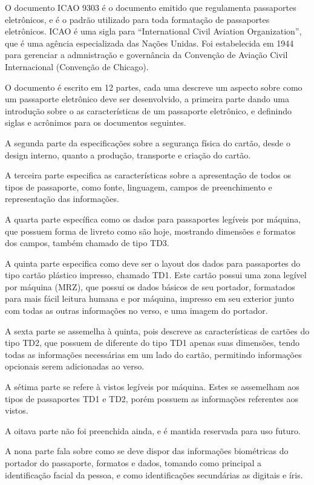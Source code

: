 \documentclass[11pt]{article}
\begin{document}
			
			 O documento ICAO 9303 é o documento emitido que regulamenta passaportes eletrônicos, e é o padrão utilizado para toda formatação de passaportes eletrônicos. ICAO é uma sigla para “International Civil Aviation Organization”, que é uma agência especializada das Nações Unidas. Foi estabelecida em 1944 para gerenciar a admnistração e governância da Convenção de Aviação Civil Internacional (Convenção de Chicago)\parencite{ICAO}.
			 
			 O documento é escrito em 12 partes, cada uma descreve um aspecto sobre como um passaporte eletrônico deve ser desenvolvido, a primeira parte dando uma introdução sobre o as características de um passaporte eletrônico, e definindo siglas e acrônimos para os documentos seguintes.
			 
			 A segunda parte da especificações sobre a segurança física do cartão, desde o design interno, quanto a produção, transporte e criação do cartão. 
			 
			 A terceira parte especifica as características sobre a apresentação de todos os tipos de passaporte, como fonte, linguagem, campos de preenchimento e representação das informações. 
			 
			 A quarta parte específica como os dados para passaportes legíveis por máquina, que possuem forma de livreto como são hoje, mostrando dimensões e formatos dos campos, também chamado de tipo TD3. 
			 
			 A quinta parte especifica como deve ser o layout dos dados para passaportes do tipo cartão plástico impresso, chamado TD1. Este cartão possui uma zona legível por máquina (MRZ), que possui os dados básicos de seu portador, formatados para mais fácil leitura humana e por máquina, impresso em seu exterior junto com todas as outras informações no verso, e uma imagem do portador.
			 
			 A sexta parte se assemelha à quinta, pois descreve as características de cartões do tipo TD2, que possuem de diferente do tipo TD1 apenas suas dimensões, tendo todas as informações necessárias em um lado do cartão, permitindo informações opcionais serem adicionadas ao verso.
			 
			 A sétima parte se refere à vistos legíveis por máquina. Estes se assemelham aos tipos de passaportes TD1 e TD2, porém possuem as informações referentes aos vistos.
			 
			 A oitava parte não foi preenchida ainda, e é mantida reservada para uso futuro.
			 
			 A nona parte fala sobre como se deve dispor das informações biométri\-cas do portador do passaporte, formatos e dados, tomando como principal a identificação facial da pessoa, e como identificações secundárias as digitais e íris.
			 
\end{document}
